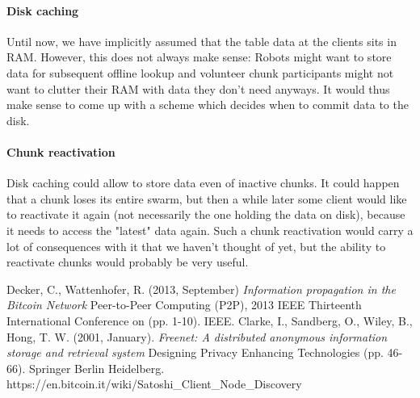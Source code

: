 \documentclass[a4paper, 10pt, conference]{ieeeconf}
\begin{document}
\paragraph{Disk caching}
Until now, we have implicitly assumed that the table data at the clients sits
in RAM. However, this does not always make sense: Robots might want to store 
data for subsequent offline lookup and volunteer chunk participants might not
want to clutter their RAM with data they don't need anyways. It would thus make
sense to come up with a scheme which decides when to commit data to the disk.

\paragraph{Chunk reactivation}
Disk caching could allow to store data even of inactive chunks. It could happen
that a chunk loses its entire swarm, but then a while later some client would
like to reactivate it again (not necessarily the one holding the data on disk),
because it needs to access the "latest" data again. Such a chunk reactivation
would carry a lot of consequences with it that we haven't thought of yet, but 
the ability to reactivate chunks would probably be very useful.

\begin{thebibliography}{9}
   Decker, C., Wattenhofer, R. (2013, September) 
    \emph{Information propagation in the Bitcoin Network} 
    Peer-to-Peer Computing (P2P), 2013 IEEE Thirteenth International Conference
    on (pp. 1-10). IEEE.
   Clarke, I., Sandberg, O., Wiley, B., Hong, T. W. 
    (2001, January). \emph{Freenet: A distributed anonymous information storage
    and retrieval system} Designing Privacy Enhancing Technologies (pp. 46-66).
    Springer Berlin Heidelberg.
    https://en.bitcoin.it/wiki/Satoshi\_Client\_Node\_Discovery
\end{thebibliography}
\end{document}
